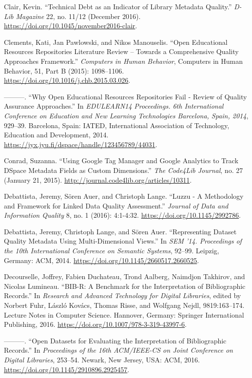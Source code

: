 Clair, Kevin. “Technical Debt as an Indicator of Library Metadata Quality.” \emph{D-Lib Magazine} 22, no. 11/12 (December 2016). \url{https://doi.org/10.1045/november2016-clair}.

Clements, Kati, Jan Pawlowski, and Nikos Manouselis. “Open Educational Resources Repositories Literature Review – Towards a Comprehensive Quality Approaches Framework.” \emph{Computers in Human Behavior}, Computers in Human Behavior, 51, Part B (2015): 1098–1106. \url{https://doi.org/10.1016/j.chb.2015.03.026}.

———. “Why Open Educational Resources Repositories Fail - Review of Quality Assurance Approaches.” In \emph{EDULEARN14 Proceedings. 6th International Conference on Education and New Learning Technologies Barcelona, Spain, 2014}, 929–39. Barcelona, Spain: IATED, International Association of Technology, Education and Development, 2014. \url{https://jyx.jyu.fi/dspace/handle/123456789/44031}.

Conrad, Suzanna. “Using Google Tag Manager and Google Analytics to Track DSpace Metadata Fields as Custom Dimensions.” \emph{The Code4Lib Journal}, no. 27 (January 21, 2015). \url{http://journal.code4lib.org/articles/10311}.

Debattista, Jeremy, Sören Auer, and Christoph Lange. “Luzzu - A Methodology and Framework for Linked Data Quality Assessment.” \emph{Journal of Data and Information Quality} 8, no. 1 (2016): 4:1-4:32. \url{https://doi.org/10.1145/2992786}.

Debattista, Jeremy, Christoph Lange, and Sören Auer. “Representing Dataset Quality Metadata Using Multi-Dimensional Views.” In \emph{SEM ’14. Proceedings of the 10th International Conference on Semantic Systems}, 92–99. Leipzig, Germany: ACM, 2014. \url{https://doi.org/10.1145/2660517.2660525}.

Decourselle, Joffrey, Fabien Duchateau, Trond Aalberg, Naimdjon Takhirov, and Nicolas Lumineau. “BIB-R: A Benchmark for the Interpretation of Bibliographic Records.” In \emph{Research and Advanced Technology for Digital Libraries}, edited by Norbert Fuhr, László Kovács, Thomas Risse, and Wolfgang Nejdl, 9819:163–174. Lecture Notes in Computer Science. Hannover, Germany: Springer International Publishing, 2016. \url{https://doi.org/10.1007/978-3-319-43997-6}.

———. “Open Datasets for Evaluating the Interpretation of Bibliographic Records.” In \emph{Proceedings of the 16th ACM/IEEE-CS on Joint Conference on Digital Libraries}, 253–54. Newark, New Jersey, USA: ACM, 2016. \url{https://doi.org/10.1145/2910896.2925457}.

